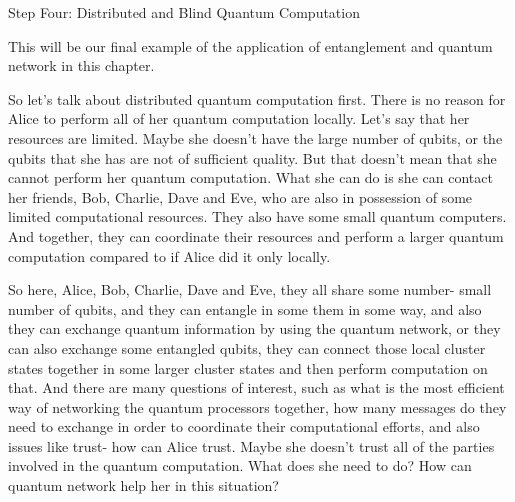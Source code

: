 Step Four: Distributed and Blind Quantum Computation

This will be our final example of the application of entanglement and quantum network in this chapter.

So let's talk about distributed quantum computation first. There is no reason for Alice to perform all of her quantum computation locally. Let's say that her resources are limited. Maybe she doesn't have the large number of qubits, or the qubits that she has are not of sufficient quality. But that doesn't mean that she cannot perform her quantum computation. What she can do is she can contact her friends, Bob, Charlie, Dave and Eve, who are also in possession of some limited computational resources. They also have some small quantum computers. And together, they can coordinate their resources and perform a larger quantum computation compared to if Alice did it only locally.

So here, Alice, Bob, Charlie, Dave and Eve, they all share some number- small number of qubits, and they can entangle in some them in some way, and also they can exchange quantum information by using the quantum network, or they can also exchange some entangled qubits, they can connect those local cluster states together in some larger cluster states and then perform computation on that. And there are many questions of interest, such as what is the most efficient way of networking the quantum processors together, how many messages do they need to exchange in order to coordinate their computational efforts, and also issues like trust- how can Alice trust. Maybe she doesn't trust all of the parties involved in the quantum computation. What does she need to do? How can quantum network help her in this situation?

